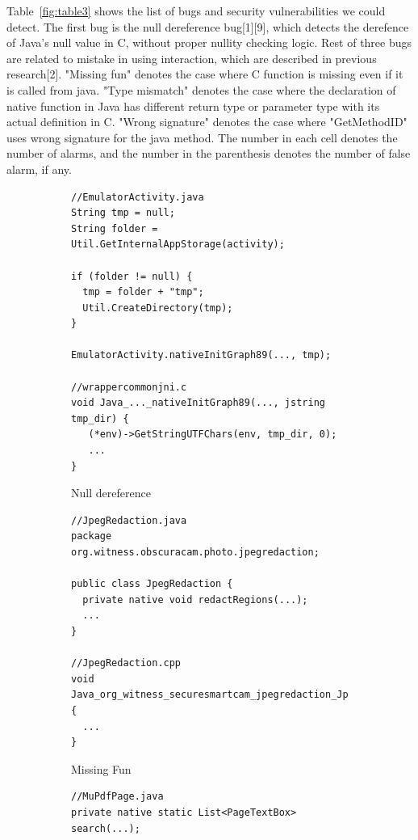 Table~\ref{fig:table3} shows the list of bugs and security vulnerabilities we could detect.
The first bug is the null dereference bug[1][9], which detects the derefence of
Java's null value in C, without proper nullity checking logic. Rest of three
bugs are related to mistake in using interaction, which are described in
previous research[2]. "Missing fun" denotes the case where C function is
missing even if it is called from java. "Type mismatch" denotes the case where
the declaration of native function in Java has different return type or
parameter type with its actual definition in C.  "Wrong signature" denotes the
case where "GetMethodID" uses wrong signature for the java method. The
number in each cell denotes the number of alarms, and the number in the
parenthesis denotes the number of false alarm, if any.

\begin{figure}[t]
  \centering
  \vspace{2mm}
  \begin{subfigure}[t]{0.5\textwidth}
    \begin{lstlisting}[style=cpp,xleftmargin=2.5em]
//EmulatorActivity.java
String tmp = null;
String folder = Util.GetInternalAppStorage(activity);

if (folder != null) {
  tmp = folder + "tmp";
  Util.CreateDirectory(tmp);
}

EmulatorActivity.nativeInitGraph89(..., tmp);

//wrappercommonjni.c
void Java_..._nativeInitGraph89(..., jstring tmp_dir) {
   (*env)->GetStringUTFChars(env, tmp_dir, 0);
   ...
}
    \end{lstlisting}
    \vspace*{-.5em}
    \caption{Null dereference}
    \label{fig:bug1}
  \end{subfigure}
  \begin{subfigure}[t]{0.5\textwidth}
    \begin{lstlisting}[style=cpp,xleftmargin=2.5em]
//JpegRedaction.java
package org.witness.obscuracam.photo.jpegredaction;

public class JpegRedaction {
  private native void redactRegions(...);
  ...
}

//JpegRedaction.cpp
void
Java_org_witness_securesmartcam_jpegredaction_JpegRedaction_redactRegions(...) {
  ...
}
    \end{lstlisting}
    \vspace*{-.5em}
    \caption{Missing Fun}
    \label{fig:bug2}
  \end{subfigure}
  \begin{subfigure}[t]{0.5\textwidth}
    \begin{lstlisting}[style=cpp,xleftmargin=2.5em]
//MuPdfPage.java
private native static List<PageTextBox> search(...);


\end{lstlisting}
\end{subfigure}
\end{figure}
